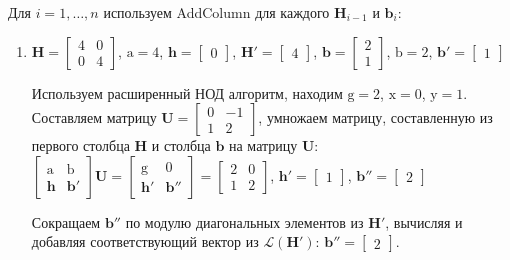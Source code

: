 Для $ i = 1, \ldots, n $ используем AddColumn для каждого $ \mathbf{H}_{i - 1} $ и $ \mathbf{b}_i $:
\begin{enumerate}

\item $ \mathbf{H} = \left[\begin{array}{cccc}
4 & 0 \\
0 & 4
\end{array}\right] $, $ \mathrm{a} = 4 $, $ \mathbf{h} = \left[\begin{array}{cccc}
0 
\end{array}\right] $, $ \mathbf{H}' = \left[ \begin{array}{cccc}
4
\end{array}\right] $, $ \mathbf{b} = \left[\begin{array}{cccc}
2 \\
1
\end{array}\right] $, $ \mathrm{b} = 2 $, $ \mathbf{b}' = \left[ \begin{array}{cccc}
1
\end{array}\right] $

Используем расширенный НОД алгоритм, находим $ \mathrm{g} = 2 $, $ \mathrm{x} = 0 $, $ \mathrm{y} = 1 $. Составляем матрицу $  \mathbf{U} = \left[\begin{array}{cccc}
0 & -1 \\
1 & 2
\end{array}\right] $, умножаем матрицу, составленную из первого столбца $ \mathbf{H} $ и столбца $ \mathbf{b} $ на матрицу $ \mathbf{U} $: $ \left[ \begin{array}{cccc}
\mathrm{a} & \mathrm{b} \\
\mathbf{h} & \mathbf{b}' \end{array} \right] \mathbf{U}=
\left[ \begin{array}{cccc}
\mathrm{g} & \mathrm{0} \\
\mathbf{h}' & \mathbf{b}'' \end{array} \right] = \left[\begin{array}{cccc}
2 & 0 \\
1 & 2
\end{array}\right] $, $ \mathbf{h}' = \left[\begin{array}{cccc}
1
\end{array}\right] $, $ \mathbf{b}'' = \left[\begin{array}{cccc}
2
\end{array}\right] $

Сокращаем $ \mathbf{b}'' $ по модулю диагональных элементов из $ \mathbf{H}' $, вычисляя и добавляя соответствующий вектор из $ \mathcal{L}(\mathbf{H}') $: $ \mathbf{b}'' = \left[ \begin{array}{cccc}
2
\end{array}\right] $.


\end{enumerate}
